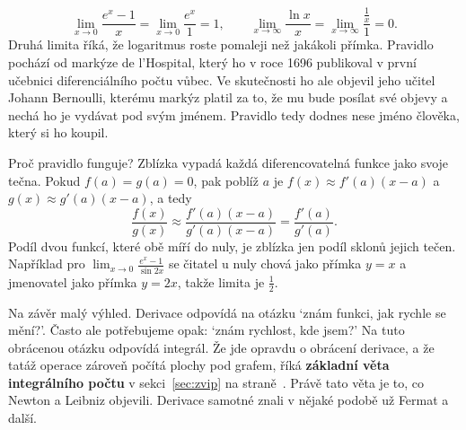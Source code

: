 \begin{example}
  \begin{equation*}
    \lim_{x\to 0}\frac{e^x - 1}{x} = \lim_{x\to 0}\frac{e^x}{1} = 1,\qquad\lim_{x\to\infty}\frac{\ln x}{x} = \lim_{x\to\infty}\frac{\frac{1}{x}}{1} = 0.
  \end{equation*}
  Druhá limita říká, že logaritmus roste pomaleji než jakákoli přímka. Pravidlo pochází od markýze de l'Hospital, který ho v roce 1696 publikoval v první učebnici diferenciálního počtu vůbec. Ve skutečnosti ho ale objevil jeho učitel Johann Bernoulli, kterému markýz platil za to, že mu bude posílat své objevy a nechá ho je vydávat pod svým jménem. Pravidlo tedy dodnes nese jméno člověka, který si ho koupil.
\end{example}

Proč pravidlo funguje? Zblízka vypadá každá diferencovatelná funkce jako svoje tečna. Pokud $f(a) = g(a) = 0$, pak poblíž $a$ je $f(x)\approx f'(a)(x - a)$ a $g(x)\approx g'(a)(x - a)$, a tedy
\begin{equation*}
  \frac{f(x)}{g(x)}\approx\frac{f'(a)(x - a)}{g'(a)(x - a)} = \frac{f'(a)}{g'(a)}.
\end{equation*}
Podíl dvou funkcí, které obě míří do nuly, je zblízka jen podíl sklonů jejich tečen. Například pro $\lim_{x\to 0}\frac{e^x - 1}{\sin 2x}$ se čitatel u nuly chová jako přímka $y = x$ a jmenovatel jako přímka $y = 2x$, takže limita je $\frac{1}{2}$.

\begin{center}
\end{center}

Na závěr malý výhled. Derivace odpovídá na otázku `znám funkci, jak rychle se mění?'. Často ale potřebujeme opak: `znám rychlost, kde jsem?' Na tuto obrácenou otázku odpovídá integrál. Že jde opravdu o obrácení derivace, a že tatáž operace zároveň počítá plochy pod grafem, říká \textbf{základní věta integrálního počtu} v sekci~\ref{sec:zvip} na straně~\pageref{sec:zvip}. Právě tato věta je to, co Newton a Leibniz objevili. Derivace samotné znali v nějaké podobě už Fermat a další.


